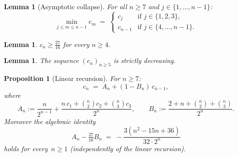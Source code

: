 \documentclass[reqno,final,11pt]{amsart}
\theoremstyle{plain}
\newtheorem{proposition}[theorem]{Proposition}
\newtheorem{lemma}[theorem]{Lemma}
\theoremstyle{definition}
\theoremstyle{remark}
\begin{document}
\begin{lemma}[Asymptotic collapse]\label{lem:collapse}
  For all $n\ge 7$ and $j\in\{1,\dots,n-1\}$:
  \begin{equation}\label{eq:collapse}
    \min_{j\le m\le n-1}c_m
    \;=\;
    \begin{cases}
      c_j     & \text{if } j\in\{1,2,3\},\\
      c_{n-1} & \text{if } j\in\{4,\dots,n-1\}.
    \end{cases}
  \end{equation}
\end{lemma}

\begin{lemma}\label{lem:lower}
  $c_n\ge\tfrac{27}{16}$ for every $n\ge 4$.
\end{lemma}

\begin{lemma}\label{lem:decreasing}
  The sequence $(c_n)_{n\ge 5}$ is strictly decreasing.
\end{lemma}

\begin{proposition}[Linear recursion]\label{prop:linear}
  For $n\ge 7$:
  \begin{equation}\label{eq:cn-linear}
    c_n \;=\; A_n + (1-B_n)\,c_{n-1},
  \end{equation}
  where
  \begin{equation}\label{eq:AB}
    A_n := \frac{n}{2^{n-1}}
    + \frac{n\,c_1+\binom{n}{2}c_2+\binom{n}{3}c_3}{2^n},
    \qquad
    B_n := \frac{2+n+\binom{n}{2}+\binom{n}{3}}{2^n}.
  \end{equation}
  Moreover the algebraic identity
  \begin{equation}\label{eq:alg-id}
    A_n - \tfrac{27}{16}B_n
    \;=\; -\frac{3(n^2-15n+36)}{32\cdot 2^n}
  \end{equation}
  holds for every~$n\ge 1$ (independently of the linear recursion).
\end{proposition}
\end{document}
